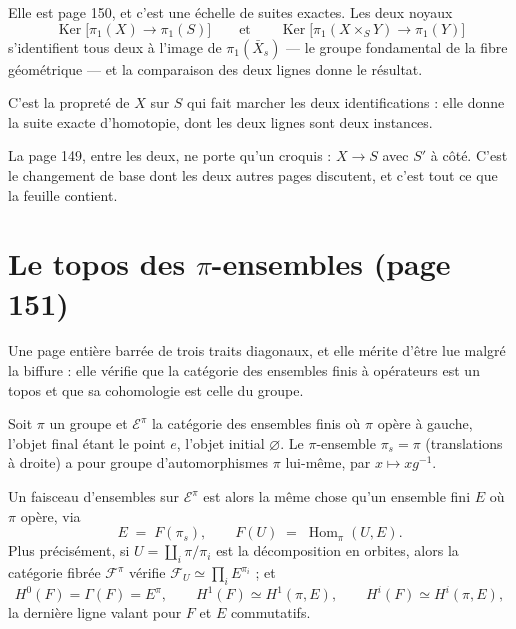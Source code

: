 \documentclass[11pt,a4paper]{article}
\begin{document}
Elle est page 150, et c'est une échelle de suites exactes. Les deux noyaux
\[
  \operatorname{Ker}\bigl[\pi_{1}(X) \to \pi_{1}(S)\bigr]
  \qquad\text{et}\qquad
  \operatorname{Ker}\bigl[\pi_{1}(X \times_{S} Y) \to \pi_{1}(Y)\bigr]
\]
s'identifient tous deux à l'image de $\pi_{1}(\bar{X}_{s})$ --- le groupe
fondamental de la fibre géométrique --- et la comparaison des deux lignes donne
le résultat.


C'est la propreté de $X$ sur $S$ qui fait marcher les deux identifications :
elle donne la suite exacte d'homotopie, dont les deux lignes sont deux
instances.

La page 149, entre les deux, ne porte qu'un croquis : $X \to S$ avec $S'$ à
côté. C'est le changement de base dont les deux autres pages discutent, et
c'est tout ce que la feuille contient.

\section*{Le topos des $\pi$-ensembles (page 151)}

Une page entière barrée de trois traits diagonaux, et elle mérite d'être lue
malgré la biffure : elle vérifie que la catégorie des ensembles finis à
opérateurs est un topos et que sa cohomologie est celle du groupe.

Soit $\pi$ un groupe et $\mathcal{E}^{\pi}$ la catégorie des ensembles finis où
$\pi$ opère à gauche, l'objet final étant le point $e$, l'objet initial
$\varnothing$. Le $\pi$-ensemble $\pi_{s} = \pi$ (translations à droite) a pour
groupe d'automorphismes $\pi$ lui-même, par $x \mapsto xg^{-1}$.

Un faisceau d'ensembles sur $\mathcal{E}^{\pi}$ est alors la même chose qu'un
ensemble fini $E$ où $\pi$ opère, via
\[
  E \;=\; F(\pi_{s}) , \qquad
  F(U) \;=\; \operatorname{Hom}_{\pi}(U, E) .
\]
Plus précisément, si $U = \coprod_{i} \pi/\pi_{i}$ est la décomposition en
orbites, alors la catégorie fibrée $\mathcal{F}^{\pi}$ vérifie
$\mathcal{F}_{U} \simeq \prod_{i} E^{\pi_{i}}$ ; et
\[
  H^{0}(F) = \Gamma(F) = E^{\pi} , \qquad
  H^{1}(F) \simeq H^{1}(\pi, E) , \qquad
  H^{i}(F) \simeq H^{i}(\pi, E) ,
\]
la dernière ligne valant pour $F$ et $E$ commutatifs.
\end{document}
